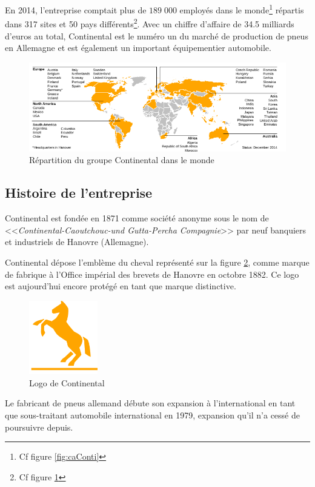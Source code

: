 		 En 2014, l'entreprise comptait plus de $189\;000$ employés dans le monde\footnote{Cf figure \ref{fig:caConti}} répartis dans 317 sites et 50 pays différents\footnote{Cf figure \ref{fig:repartitionConti}}. Avec un chiffre d'affaire de 34.5 milliards d'euros au total, Continental est le numéro un du marché de production de pneus en Allemagne et est également un important équipementier automobile.
		 \begin{figure}[H]
		 	\centering
		 	\includegraphics[width=18cm]{contents/images/repartitionConti.png}
		 	\caption{Répartition du groupe Continental dans le monde}
		 	\label{fig:repartitionConti}
		 \end{figure}		 

		\subsection{Histoire de l'entreprise}
		Continental est fondée en 1871 comme société anonyme sous le nom de <<\textit{Continental-Caoutchouc-und Gutta-Percha Compagnie}>> par neuf banquiers et industriels de Hanovre (Allemagne).

		Continental dépose l'emblème du cheval représenté sur la figure \ref{fig:logo}, comme marque de fabrique à l'Office impérial des brevets de Hanovre en octobre 1882. Ce logo est aujourd'hui encore protégé en tant que marque distinctive.
		\begin{figure}[H]
			\centering
			\includegraphics[width=3cm]{contents/images/logoConti.png}
			\caption{Logo de Continental}
			\label{fig:logo}
		\end{figure}

		Le fabricant de pneus allemand débute son expansion à l'international en tant que sous-traitant automobile international en 1979, expansion qu'il n'a cessé de poursuivre depuis.
		
